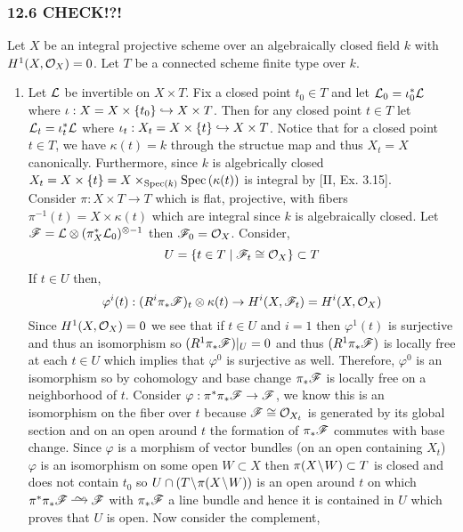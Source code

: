 \documentclass[12pt]{article}
\begin{document}
\subsubsection{12.6 CHECK!?!}

Let $X$ be an integral projective scheme over an algebraically closed field $k$ with $H^1(X, \mathcal{O}_{X}) = 0$. Let $T$ be a connected scheme finite type over $k$.

\begin{enumerate}
\item Let $\mathcal{L}$ be invertible on $X \times T$. Fix a closed point $t_0 \in T$ and let $\mathcal{L}_0 = \iota_0^* \mathcal{L}$ where $\iota : X = X \times \{t_0\} \hookrightarrow X \times T$. Then for any closed point $t \in T$ let $\mathcal{L}_t = \iota^*_t \mathcal{L}$ where $\iota_t : X_t = X \times \{ t \} \hookrightarrow X \times T$. Notice that for a closed point $t \in T$, we have $\kappa(t) = k$ through the structue map and thus $X_t = X$ canonically. Furthermore, since $k$ is algebrically closed $X_t = X \times \{ t \} = X \times_{\mathrm{Spec}\left( k \right)} \mathrm{Spec}\left( \kappa(t) \right)$ is integral by [II, Ex. 3.15].
\bigskip\\
Consider $\pi : X \times T \to T$ which is flat, projective, with fibers $\pi^{-1}(t) = X \times \kappa(t)$ which are integral since $k$ is algebraically closed. Let $\mathscr{F} = \mathcal{L} \otimes (\pi_X^* \mathcal{L}_0)^{\otimes -1}$ then $\mathscr{F}_0 = \mathcal{O}_{X}$. Consider,
\[ U = \{ t \in T \mid \mathscr{F}_t \cong \mathcal{O}_{X} \} \subset T \]
If $t \in U$ then,
\[ \varphi^i(t) : (R^i \pi_* \mathscr{F})_t \otimes \kappa(t) \to H^i(X, \mathscr{F}_t) = H^i(X, \mathcal{O}_{X})  \]
Since $H^1(X, \mathcal{O}_{X}) = 0$ we see that if $t \in U$ and $i = 1$ then $\varphi^1(t)$ is surjective and thus an isomorphism so $(R^1 \pi_* \mathscr{F})|_U = 0$ and thus $(R^1 \pi_* \mathscr{F})$ is locally free at each $t \in U$ which implies that $\varphi^0$ is surjective as well. Therefore, $\varphi^0$ is an isomorphism so by cohomology and base change $\pi_* \mathscr{F}$ is locally free on a neighborhood of $t$. Consider $\varphi : \pi^* \pi_* \mathscr{F} \to \mathscr{F}$, we know this is an isomorphism on the fiber over $t$ because $\mathscr{F} \cong \mathcal{O}_{X_t}$ is generated by its global section and on an open around $t$ the formation of $\pi_* \mathscr{F}$ commutes with base change.  Since $\varphi$ is a morphism of vector bundles (on an open containing $X_t$) $\varphi$ is an isomorphism on some open $W \subset X$ then $\pi(X \! \setminus \! W) \subset T$ is closed and does not contain $t_0$ so $U \cap (T \! \setminus \! \pi(X \! \setminus \! W))$ is an open around $t$ on which $\pi^* \pi_* \F \iso \F$ with $\pi_* \mathscr{F}$ a line bundle and hence it is contained in $U$ which proves that $U$ is open. Now consider the complement,

\end{enumerate}
\end{document}
